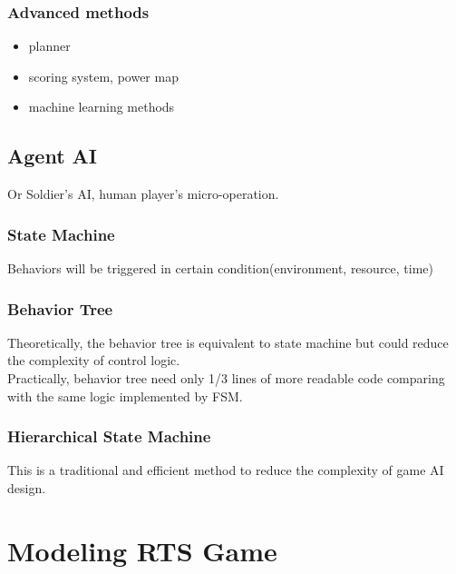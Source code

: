 \documentclass[sigconf]{acmart}
\begin{document}
\subsubsection{Advanced methods}
\begin{itemize}
\item planner
\item scoring system, power map
\item machine learning methods
\end{itemize}

\subsection{Agent AI}
Or Soldier's AI, human player's micro-operation.

\subsubsection{State Machine}
Behaviors will be triggered in certain condition(environment, resource, time)

\subsubsection{Behavior Tree}
Theoretically, the behavior tree is equivalent to state machine but could reduce the complexity of control logic.\\
Practically, behavior tree need only 1/3 lines of more readable code  comparing with the same logic implemented by FSM.

\subsubsection{Hierarchical State Machine}
This is a traditional and efficient method to reduce the complexity of game AI design.

\section{Modeling RTS Game}
\end{document}
